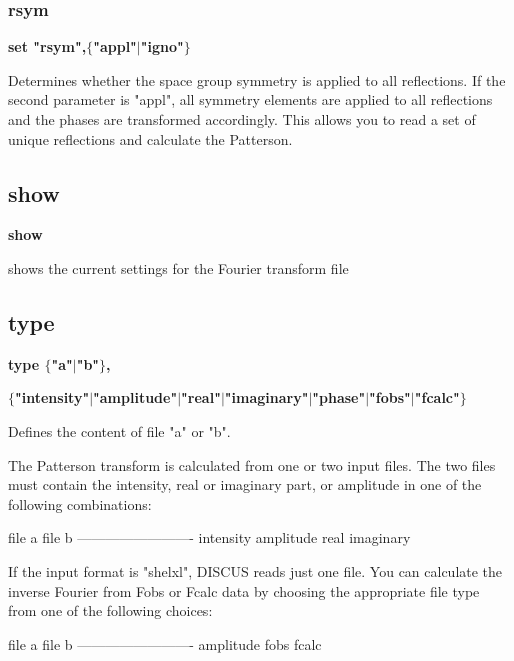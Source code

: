 \subsubsection{rsym}
{\bf set "rsym",$ \{$"appl"$| $"igno"$\} $ \par }
\par
\vspace{3pt}
Determines whether the space group symmetry is applied to all reflections. 
If the second parameter is "appl", all symmetry elements are applied to 
all reflections and the phases are transformed accordingly. This allows 
you to read a set of unique reflections and calculate the Patterson. 
\subsection*{show}
{\bf show \par }
\par
\vspace{3pt}
shows the current settings for the Fourier transform file 
\subsection*{type}
{\bf type $ \{$"a"$| $"b"$\} $, \par }
{\bf      $ \{$"intensity"$| $"amplitude"$| $"real"$| $"imaginary"$| $"phase"$| $"fobs"$| $"fcalc"$\} $ \par }
\par
\vspace{3pt}
Defines the content of file "a" or "b". 
\par
The Patterson transform is calculated from one or two input files. 
The two files must contain the intensity, real or imaginary part, 
or amplitude in one of the following combinations: 
\par
\begin{MacVerbatim}
file a          file b
-------------------------
intensity
amplitude
real            imaginary
\end{MacVerbatim}
If the input format is "shelxl", DISCUS reads just one file. You can 
calculate the inverse Fourier from Fobs or Fcalc data by choosing the 
appropriate file type from one of the following choices: 
\par
\begin{MacVerbatim}
file a          file b
-------------------------
amplitude
fobs
fcalc
\end{MacVerbatim}
